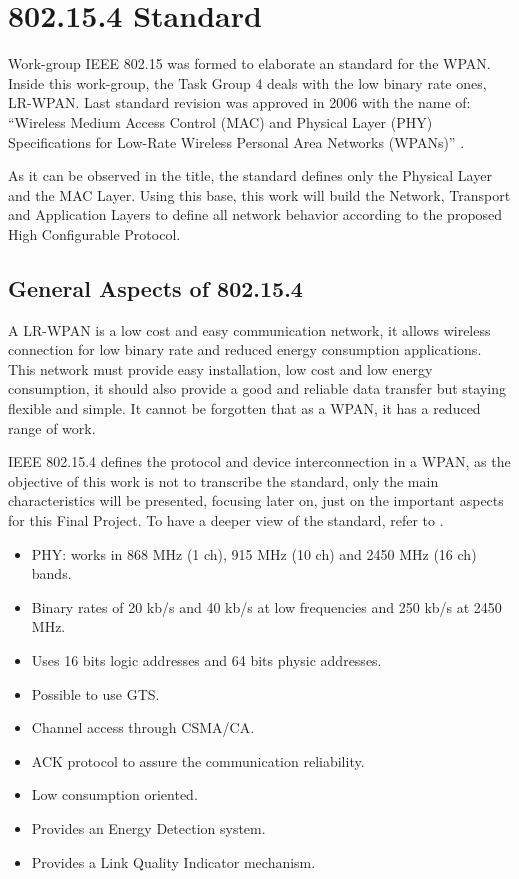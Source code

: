 \chapter{802.15.4 Standard}
\label{chap:802154standard}

Work-group \ac{IEEE} 802.15 was formed to elaborate an standard for the \ac{WPAN}. Inside this work-group, the Task Group 4 
deals with the low binary rate ones, \ac{LR-WPAN}. Last standard revision was approved in 2006 with the name of: ``Wireless 
Medium Access Control (\ac{MAC}) and Physical Layer (\ac{PHY}) Specifications for Low-Rate Wireless Personal Area Networks (\acp{WPAN})'' 
\cite{IEEE802.15.4-2006}.

As it can be observed in the title, the standard defines only the Physical Layer and the \ac{MAC} Layer. Using this base, 
this work will build the Network, Transport and Application Layers to define all network behavior according to the proposed 
High Configurable Protocol.

\section{General Aspects of 802.15.4}

A \ac{LR-WPAN} is a low cost and easy communication network, it allows wireless connection for low binary rate and reduced 
energy consumption applications. This network must provide easy installation, low cost and low energy consumption, it should
also provide a good and reliable data transfer but staying flexible and simple. It cannot be forgotten that as a \ac{WPAN}, it
has a reduced range of work.

\ac{IEEE} 802.15.4 defines the protocol and device interconnection in a \ac{WPAN}, as the objective of this work is not to 
transcribe the standard, only the main characteristics will be presented, focusing later on, just on the important aspects
for this Final Project. To have a deeper view of the standard, refer to \cite{IEEE802.15.4-2006}.

\begin{itemize}
 \item \ac{PHY}: works in 868 MHz (1 ch), 915 MHz (10 ch) and 2450 MHz (16 ch) bands.
 \item Binary rates of 20 kb/s and 40 kb/s at low frequencies and 250 kb/s at 2450 MHz.
 \item Uses 16 bits logic addresses and 64 bits physic addresses.
 \item Possible to use \ac{GTS}.
 \item Channel access through \ac{CSMA/CA}.
 \item \ac{ACK} protocol to assure the communication reliability.
 \item Low consumption oriented.
 \item Provides an Energy Detection system.
 \item Provides a Link Quality Indicator mechanism.
\end{itemize}

